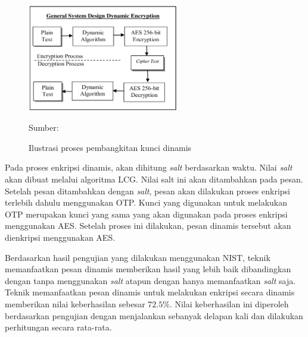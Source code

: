 \begin{figure}[!h]
  \centering
  \includegraphics[width=250px]{chapters/res/chapter-2/img/bachtiar.enc.process.png}
  \caption{Ilustrasi proses pembangkitan kunci dinamis} \label{fig:bachtiar.enc.process}
  Sumber: \textcite{bachtiar2018}
\end{figure}

Pada proses enkripsi dinamis, akan dihitung \emph{salt} berdasarkan waktu. Nilai \emph{salt} akan dibuat melalui algoritma LCG.  Nilai salt ini akan ditambahkan pada pesan. Setelah pesan ditambahkan dengan \emph{salt}, pesan akan dilakukan proses enkripsi terlebih dahulu menggunakan OTP. Kunci yang digunakan untuk melakukan OTP merupakan kunci yang sama yang akan digunakan pada proses enkripsi menggunakan AES. Setelah proses ini dilakukan, pesan dinamis tersebut akan dienkripsi menggunakan AES.

Berdasarkan hasil pengujian yang dilakukan menggunakan NIST, teknik memanfaatkan pesan dinamis memberikan hasil yang lebih baik dibandingkan dengan tanpa menggunakan \emph{salt} atapun dengan hanya memanfaatkan \emph{salt} saja. Teknik memanfaatkan pesan dinamis untuk melakukan enkripsi secara dinamis memberikan nilai keberhasilan sebesar $72.5\%$. Nilai keberhasilan ini diperoleh berdasarkan pengujian dengan menjalankan sebanyak delapan kali dan dilakukan perhitungan secara rata-rata.
